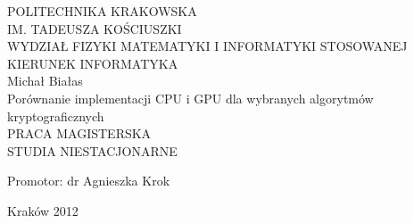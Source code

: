 \thispagestyle{empty}
\begin{center}
    \large POLITECHNIKA KRAKOWSKA\\
    IM. TADEUSZA KOŚCIUSZKI\\
    WYDZIAŁ FIZYKI MATEMATYKI I INFORMATYKI STOSOWANEJ\\
    KIERUNEK INFORMATYKA\\
    \vspace{5cm}
    \LARGE Michał Białas\\
    \vspace{2cm}
    \Large Porównanie implementacji CPU i GPU dla wybranych algorytmów kryptograficznych
    \\
    \vspace{3cm}
    \large PRACA MAGISTERSKA\\STUDIA NIESTACJONARNE\\
\end{center}
\vfill
\begin{flushright}
    Promotor: dr Agnieszka Krok
\end{flushright}
\vspace{2cm}
\begin{center}
    Kraków 2012
\end{center}

